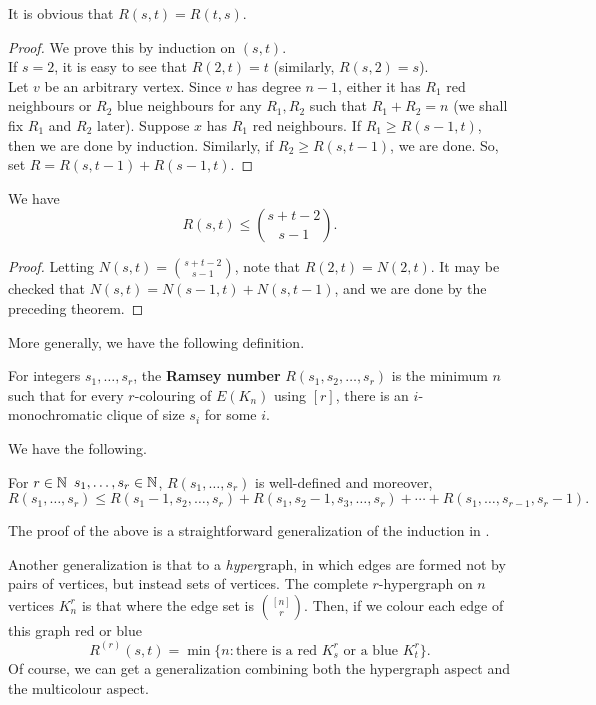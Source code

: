 	It is obvious that $R(s,t) = R(t,s)$.

	\begin{proof}
		We prove this by induction on $(s,t)$.\\
		If $s=2$, it is easy to see that $R(2,t) = t$ (similarly, $R(s,2) = s$).\\
		Let $v$ be an arbitrary vertex. Since $v$ has degree $n-1$, either it has $R_1$ red neighbours or $R_2$ blue neighbours for any $R_1,R_2$ such that $R_1 + R_2 = n$ (we shall fix $R_1$ and $R_2$ later). Suppose $x$ has $R_1$ red neighbours. If $R_1 \ge R(s-1,t)$, then we are done by induction. Similarly, if $R_2 \ge R(s,t-1)$, we are done. So, set $R = R(s,t-1) + R(s-1,t)$.
	\end{proof}

	\begin{fcor}
		\label{cor: trivial ramsey bound}
		We have
		\[ R(s,t) \le \binom{s+t-2}{s-1}. \]
	\end{fcor}
	\begin{proof}
		Letting $N(s,t) = \binom{s+t-2}{s-1}$, note that $R(2,t) = N(2,t)$. It may be checked that $N(s,t) = N(s-1,t) + N(s,t-1)$, and we are done by the preceding theorem.
	\end{proof}
	
	More generally, we have the following definition.

	\begin{fdef}
		For integers $s_1,\ldots,s_r$, the \textbf{Ramsey number} $R(s_1,s_2,\ldots,s_r)$ is the minimum $n$ such that for every $r$-colouring of $E(K_n)$ using $[r]$, there is an $i$-monochromatic clique of size $s_i$ for some $i$.
	\end{fdef}

	We have the following.

	\begin{ftheo}
		For $r\in\mathbb{N}$ $s_1,\ldots,s_r \in \mathbb{N}$, $R(s_1,\ldots,s_r)$ is well-defined and moreover,
		\[ R(s_1,\ldots,s_r) \le R(s_1-1,s_2,\ldots,s_r) + R(s_1,s_2-1,s_3,\ldots,s_r) + \cdots + R(s_1,\ldots,s_{r-1},s_r-1). \]
	\end{ftheo}
	The proof of the above is a straightforward generalization of the induction in .

	Another generalization is that to a \emph{hyper}graph, in which edges are formed not by pairs of vertices, but instead sets of vertices. The complete $r$-hypergraph on $n$ vertices $K_n^r$ is that where the edge set is $\binom{[n]}{r}$. Then, if we colour each edge of this graph red or blue
	\[ R^{(r)}(s,t) = \min\{n : \text{there is a red $K_s^r$ or a blue $K_t^r$} \}. \]
	Of course, we can get a generalization combining both the hypergraph aspect and the multicolour aspect.

